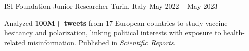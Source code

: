 \begin{cventries}
  \cventry
    {ISI Foundation} %
    {Junior Researcher} %
    {Turin, Italy} %
    {May 2022 – May 2023} %
    {
      \begin{cvitems}
        \item {Analyzed \textbf{100M+ tweets} from 17 European countries to study vaccine hesitancy and polarization, linking political interests with exposure to health-related misinformation. Published in \textit{Scientific Reports}.}
      \end{cvitems}
    }

\end{cventries}
